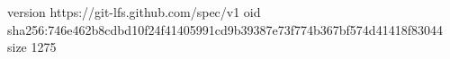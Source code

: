 version https://git-lfs.github.com/spec/v1
oid sha256:746e462b8cdbd10f24f41405991cd9b39387e73f774b367bf574d41418f83044
size 1275
